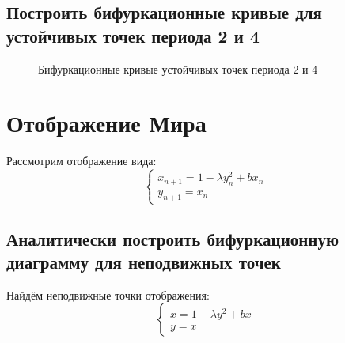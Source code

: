 \documentclass[12pt, a4paper]{article}
\begin{document}
\subsection{Построить бифуркационные кривые для устойчивых точек периода 2 и 4}
\begin{figure}[H]
	\caption{Бифуркационные кривые устойчивых точек периода 2 и 4}
\end{figure}
\section{Отображение Мира}
Рассмотрим отображение вида:
\begin{equation*}
	\begin{cases}
		x_{n + 1} = 1 - \lambda y^2_n + b x_n \\
		y_{n + 1} = x_n
	\end{cases}
\end{equation*}

\subsection{Аналитически построить бифуркационную диаграмму для неподвижных точек}
Найдём неподвижные точки отображения:
\begin{equation*}
	\begin{cases}
		x = 1 - \lambda y^2 + b x \\
		y = x
	\end{cases}
\end{equation*}
\end{document}
